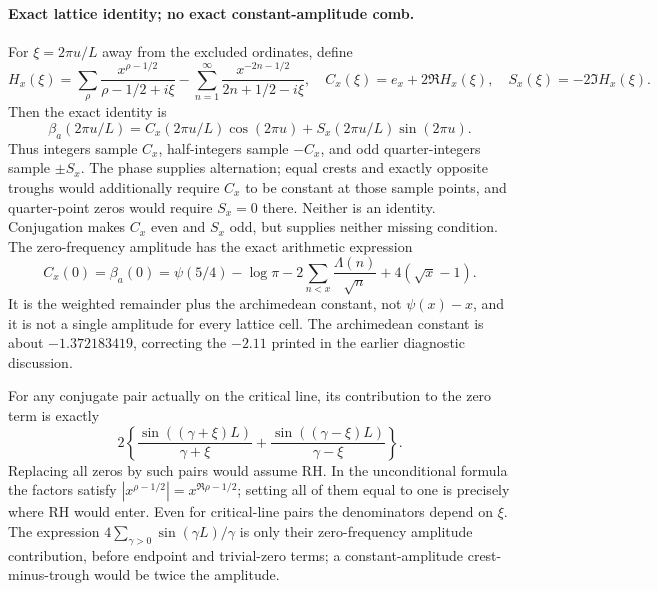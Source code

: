 \documentclass[11pt]{article}
\theoremstyle{remark}
\begin{document}
\paragraph{Exact lattice identity; no exact constant-amplitude comb.}
For $\xi=2\pi u/L$ away from the excluded ordinates, define
\[
 H_x(\xi)=\sum_\rho\frac{x^{\rho-1/2}}{\rho-1/2+i\xi}
       -\sum_{n=1}^\infty\frac{x^{-2n-1/2}}{2n+1/2-i\xi},\quad
 C_x(\xi)=e_x+2\Re H_x(\xi),\quad S_x(\xi)=-2\Im H_x(\xi).
\]
Then the exact identity is
\begin{equation}\label{eq:v146-lattice}
 \beta_a(2\pi u/L)=C_x(2\pi u/L)\cos(2\pi u)
                         +S_x(2\pi u/L)\sin(2\pi u).
\end{equation}
Thus integers sample $C_x$, half-integers sample $-C_x$, and odd
quarter-integers sample $\pm S_x$. The phase supplies alternation;
equal crests and exactly opposite troughs would additionally require
$C_x$ to be constant at those sample points, and quarter-point zeros
would require $S_x=0$ there. Neither is an identity. Conjugation makes
$C_x$ even and $S_x$ odd, but supplies neither missing condition.
The zero-frequency amplitude has the exact arithmetic expression
\begin{equation}\label{eq:v146-amplitude}
 C_x(0)=\beta_a(0)=\psi(5/4)-\log\pi
        -2\sum_{n<x}\frac{\Lambda(n)}{\sqrt n}+4(\sqrt x-1).
\end{equation}
It is the weighted remainder plus the archimedean constant, not
$\psi(x)-x$, and it is not a single amplitude for every lattice cell.
The archimedean constant is about $-1.372183419$, correcting the
$-2.11$ printed in the earlier diagnostic discussion.

For any conjugate pair actually on the critical line, its contribution
to the zero term is exactly
\[
 2\left\{\frac{\sin((\gamma+\xi)L)}{\gamma+\xi}
        +\frac{\sin((\gamma-\xi)L)}{\gamma-\xi}\right\}.
\]
Replacing all zeros by such pairs would assume RH. In the unconditional
formula the factors satisfy $|x^{\rho-1/2}|=x^{\Re\rho-1/2}$; setting
all of them equal to one is precisely where RH would enter. Even for
critical-line pairs the denominators depend on $\xi$. The expression
$4\sum_{\gamma>0}\sin(\gamma L)/\gamma$ is only their zero-frequency
amplitude contribution, before endpoint and trivial-zero terms; a
constant-amplitude crest-minus-trough would be twice the amplitude.
\end{document}
